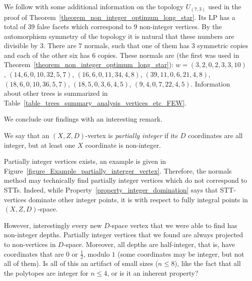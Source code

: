 We follow with some additional information on the topology $U_{(7,3)}$ used in the proof of Theorem~\ref{theorem_non_integer_optimum_long_star}. Its LP has a total of $39$ false facets which correspond to $9$ non-integer vertices. By the automorphism symmetry of the topology it is natural that these numbers are divisible by $3$. There are $7$ normals, such that one of them has 3 symmetric copies and each of the other six has 6 copies. These normals are (the first was used in Theorem~\ref{theorem_non_integer_optimum_long_star}): $w = (3, 2, 0, 2, 3, 3, 10)$, $(14, 6, 0, 10, 32, 5, 7)$, $(16, 6, 0, 11, 34, 4, 8)$, $(39, 11, 0, 6, 21, 4, 8)$, $(18, 6, 0, 10, 36, 5, 7)$, $(18, 5, 0, 3, 6, 4, 5)$, $(9, 4, 0, 7, 22, 4, 5)$. Information about other trees is summarized in Table~\ref{table_trees_summary_analysis_vertices_etc_FEW}.

We conclude our findings with an interesting remark.

\begin{definition}
\label{definition_partially_integer_vertex}
We say that an $(X,Z,D)$-vertex is \emph{partially integer} if its $D$ coordinates are all integer, but at least one $X$ coordinate is non-integer.
\end{definition}


\begin{remark}
\label{remark_new_vertices_are_non_integer_half_integer_only}
Partially integer vertices exists, an example is given in Figure~\ref{figure_Example_partially_interger_vertex}. Therefore, the normals method may technically find partially integer vertices which do not correspond to STTs. Indeed, while Property~\ref{property_integer_domination} says that STT-vertices dominate other integer points, it is with respect to fully integral points in $(X,Z,D)$-space.

However, interestingly every new $D$-space vertex that we were able to find has non-integer depths. Partially integer vertices that we found are always projected to non-vertices in $D$-space. Moreover, all depths are half-integer, that is, have coordinates that are $0$ or $\frac{1}{2}$, modulo $1$ (some coordinates may be integer, but not all of them). Is all of this an artifact of small sizes ($n \le 8$), like the fact that all the polytopes are integer for $n \le 4$, or is it an inherent property?
\end{remark}


